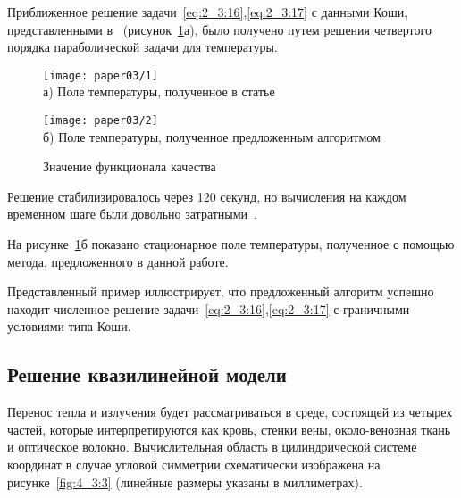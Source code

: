 Приближенное решение задачи~\eqref{eq:2_3:16},\eqref{eq:2_3:17}
с данными Коши, представленными в~\cite{Chebotarev2019Problem}
(рисунок~\ref{fig:4_3:1}а), было получено путем решения четвертого порядка
параболической задачи для температуры.
\begin{figure}[h!t]
    \begin{minipage}[b][][b]{0.49\linewidth}
        \centering
        \texttt{[image: paper03/1]} \\ а) Поле температуры,
        полученное в статье~\cite{Chebotarev2019Problem}
    \end{minipage}
    \hfill
    \begin{minipage}[b][][b]{0.49\linewidth}
        \centering
        \texttt{[image: paper03/2]} \\
        б) Поле температуры, полученное предложенным алгоритмом
    \end{minipage}
    \caption{Значение функционала качества}
    \label{fig:4_3:1}
\end{figure}

Решение стабилизировалось через 120 секунд, но
вычисления на каждом временном шаге были
довольно затратными~\cite{Chebotarev2019Problem}.


На рисунке~\ref{fig:4_3:1}б показано стационарное поле температуры,
полученное с помощью метода, предложенного в данной работе.

Представленный пример иллюстрирует, что предложенный
алгоритм успешно находит численное решение
задачи~\eqref{eq:2_3:16},\eqref{eq:2_3:17} с граничными
условиями типа Коши.



\subsection{Решение квазилинейной модели}
\label{subsec:ch4/sec3/quasilinear}
Перенос тепла и излучения будет рассматриваться в среде,
состоящей из четырех частей, которые интерпретируются как кровь,
стенки вены, около-венозная ткань и оптическое волокно.
Вычислительная область в цилиндрической системе координат в случае
угловой симметрии схематически изображена на рисунке~\ref{fig:4_3:3}
(линейные размеры указаны в миллиметрах).

